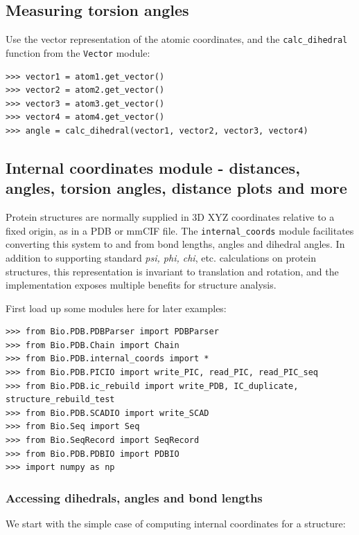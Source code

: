 \subsection{Measuring torsion angles}
Use the vector representation of the atomic coordinates, and
the \texttt{calc\_dihedral} function from the \texttt{Vector} module:
\begin{verbatim}
>>> vector1 = atom1.get_vector()
>>> vector2 = atom2.get_vector()
>>> vector3 = atom3.get_vector()
>>> vector4 = atom4.get_vector()
>>> angle = calc_dihedral(vector1, vector2, vector3, vector4)
\end{verbatim}

\subsection{Internal coordinates module - distances, angles, torsion angles, distance plots and more}
\label{sec:internal_coordinates}

Protein structures are normally supplied in 3D XYZ coordinates relative to a fixed origin, as in a PDB or mmCIF file.
The \texttt{internal\_coords} module facilitates converting this system to and from bond lengths, angles and dihedral
angles.  In addition to supporting standard \textit{psi, phi, chi}, etc. calculations on protein structures, this
representation is invariant to translation and rotation, and the implementation exposes multiple benefits for
structure analysis.

First load up some modules here for later examples:

\begin{verbatim}
>>> from Bio.PDB.PDBParser import PDBParser
>>> from Bio.PDB.Chain import Chain
>>> from Bio.PDB.internal_coords import *
>>> from Bio.PDB.PICIO import write_PIC, read_PIC, read_PIC_seq
>>> from Bio.PDB.ic_rebuild import write_PDB, IC_duplicate, structure_rebuild_test
>>> from Bio.PDB.SCADIO import write_SCAD
>>> from Bio.Seq import Seq
>>> from Bio.SeqRecord import SeqRecord
>>> from Bio.PDB.PDBIO import PDBIO
>>> import numpy as np
\end{verbatim}

\subsubsection{Accessing dihedrals, angles and bond lengths}

We start with the simple case of computing internal coordinates for a structure:

